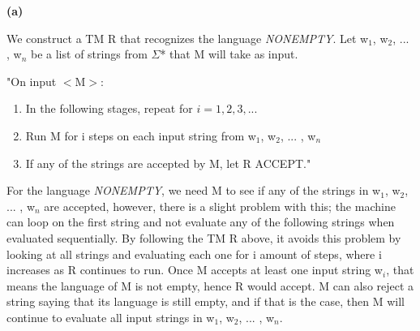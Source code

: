 \documentclass[11pt]{article}
\renewcommand\part[1]{\vspace{.10in}\textbf{(#1)}\par}
\begin{document}
	\part{a}
		We construct a TM R that recognizes the language \textit{NONEMPTY}. Let w$_{1}$, w$_{2}$, ... , w$_{n}$ be a list of strings from $\Sigma$* that M will take as input. \par
		"On input $<$M$>$:\par
		\begin{enumerate}
			\item In the following stages, repeat for $i=1,2,3, ...$
			\item \quad Run M for i steps on each input string from w$_{1}$, w$_{2}$, ... , w$_{n}$
			\item \quad If any of the strings are accepted by M, let R ACCEPT."
		\end{enumerate}\par
		For the language \textit{NONEMPTY}, we need M to see if any of the strings in w$_{1}$, w$_{2}$, ... , w$_{n}$ are accepted, however, there is a slight problem with this; the machine can loop on the first string and not evaluate any of the following strings when evaluated sequentially. By following the TM R above, it avoids this problem by looking at all strings and evaluating each one for i amount of steps, where i increases as R continues to run. Once M accepts at least one input string w$_{i}$, that means the language of M is not empty, hence R would accept. M can also reject a string saying that its language is still empty, and if that is the case, then M will continue to evaluate all input strings in w$_{1}$, w$_{2}$, ... , w$_{n}$.\par
			
\end{document}
